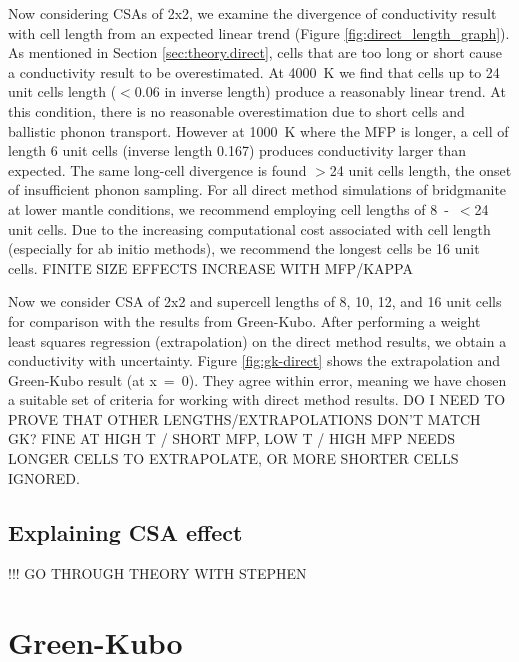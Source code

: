 Now considering CSAs of 2x2, we examine the divergence of conductivity result with cell length from an expected linear trend (Figure \ref{fig:direct_length_graph}). As mentioned in Section \ref{sec:theory.direct}, cells that are too long or short cause a conductivity result to be overestimated. At 4000~K we find that cells up to 24 unit cells length ($<$0.06 in inverse length) produce a reasonably linear trend. At this condition, there is no reasonable overestimation due to short cells and ballistic phonon transport. However at 1000~K where the MFP is longer, a cell of length 6 unit cells (inverse length 0.167) produces conductivity larger than expected. The same long-cell divergence is found $>$24 unit cells length, the onset of insufficient phonon sampling. For all direct method simulations of bridgmanite at lower mantle conditions, we recommend employing cell lengths of 8~-~$<$24 unit cells. Due to the increasing computational cost associated with cell length (especially for ab initio methods), we recommend the longest cells be 16 unit cells. FINITE SIZE EFFECTS INCREASE WITH MFP/KAPPA

Now we consider CSA of 2x2 and supercell lengths of 8, 10, 12, and 16 unit cells for comparison with the results from Green-Kubo. After performing a weight least squares regression (extrapolation) on the direct method results, we obtain a conductivity with uncertainty. Figure \ref{fig:gk-direct} shows the extrapolation and Green-Kubo result (at x~=~0). They agree within error, meaning we have chosen a suitable set of criteria for working with direct method results. DO I NEED TO PROVE THAT OTHER LENGTHS/EXTRAPOLATIONS DON'T MATCH GK? FINE AT HIGH T / SHORT MFP, LOW T / HIGH MFP NEEDS LONGER CELLS TO EXTRAPOLATE, OR MORE SHORTER CELLS IGNORED.


\subsection{\label{sec:3.DM.theory}Explaining CSA effect}

!!! GO THROUGH THEORY WITH STEPHEN


 










\section{\label{sec:3.GK}Green-Kubo}

